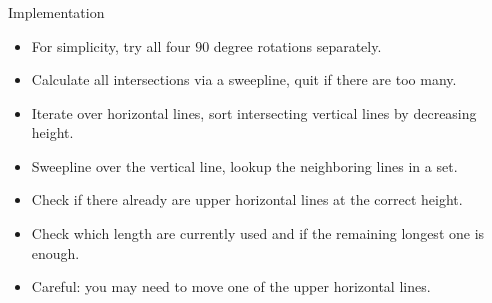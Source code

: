 \begin{frame}
    \frametitle{\problemtitle}
    \begin{block}{Implementation}
        \begin{itemize}
            \item For simplicity, try all four $90$ degree rotations separately.
            \item Calculate all intersections via a sweepline, quit if there are too many.
            \item Iterate over horizontal lines, sort intersecting vertical lines by decreasing height.
            \item Sweepline over the vertical line, lookup the neighboring lines in a set.
            \item Check if there already are upper horizontal lines at the correct height.
            \item Check which length are currently used and if the remaining longest one is enough.
            \item Careful: you may need to move one of the upper horizontal lines.
        \end{itemize}
    \end{block}
    \pause
    \solvestats
\end{frame}
